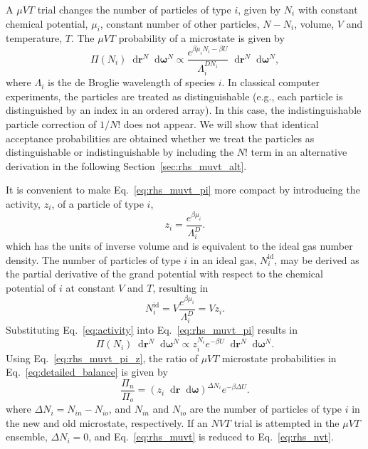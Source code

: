 \documentclass[
  9pt,
  bestpractices,
]{livecoms}
\newcommand*\diff{\mathop{}\!\mathrm{d}}
\begin{document}
A $\mu VT$ trial changes the number of particles of type $i$, given by $N_i$ with constant chemical potential, $\mu_i$, constant number of other particles, $N-N_i$, volume, $V$ and temperature, $T$.
The $\mu VT$ probability of a microstate is given by \cite{norman_investigation_1969, adams_grand_1975, allen_computer_1989, frenkel_understanding_2002}
\begin{equation}
\Pi(N_i) \diff\mathbf{r}^N \diff\boldsymbol{\omega}^N\propto \frac{e^{\beta\mu_i N_i - \beta U}}{\Lambda_i^{DN_i}} \diff\mathbf{r}^N\diff\boldsymbol{\omega}^N,
\label{eq:rhs_muvt_pi}
\end{equation}
where $\Lambda_i$ is the de Broglie wavelength of species $i$.
In classical computer experiments, the particles are treated as distinguishable (e.g., each particle is distinguished by an index in an ordered array).
In this case, the indistinguishable particle correction of $1/N!$ does not appear.
We will show that identical acceptance probabilities are obtained whether we treat the particles as distinguishable or indistinguishable by including the $N!$ term in an alternative derivation in the following Section~\ref{sec:rhs_muvt_alt}.

It is convenient to make Eq.~\ref{eq:rhs_muvt_pi} more compact by introducing the activity, $z_i$, of a particle of type $i$,
\begin{equation}
z_i = \frac{e^{\beta \mu_i}}{\Lambda_i^D}.
\label{eq:activity}
\end{equation}
which has the units of inverse volume and is equivalent to the ideal gas number density.
The number of particles of type $i$ in an ideal gas, $N_{i}^{\mathrm{id}}$, may be derived as the partial derivative of the grand potential with respect to the chemical potential of $i$ at constant $V$ and $T$, resulting in
\begin{equation}
N_{i}^{\mathrm{id}} = V\frac{e^{\beta \mu_i}}{\Lambda_i^D} = Vz_i.
\label{eq:gce_ideal_gas_density}
\end{equation}
Substituting Eq.~\ref{eq:activity} into Eq.~\ref{eq:rhs_muvt_pi} results in
\begin{equation}
\Pi(N_i) \diff\mathbf{r}^N \diff\boldsymbol{\omega}^N\propto z_i^{N_i} e^{-\beta U} \diff\mathbf{r}^N\diff\boldsymbol{\omega}^N.
\label{eq:rhs_muvt_pi_z}
\end{equation}
Using Eq.~\ref{eq:rhs_muvt_pi_z}, the ratio of $\mu VT$ microstate probabilities in Eq.~\ref{eq:detailed_balance} is given by
\begin{equation}
\frac{\Pi_n}{\Pi_o} = (z_i\diff\mathbf{r}\diff\boldsymbol{\omega})^{\Delta N_i} e^{-\beta\Delta U}.
\label{eq:rhs_muvt}
\end{equation}
where $\Delta N_i = N_{in} - N_{io}$, and $N_{in}$ and $N_{io}$ are the number of particles of type $i$ in the new and old microstate, respectively.
If an $NVT$ trial is attempted in the $\mu VT$ ensemble, $\Delta N_i=0$, and Eq.~\ref{eq:rhs_muvt} is reduced to Eq.~\ref{eq:rhs_nvt}.
\end{document}
